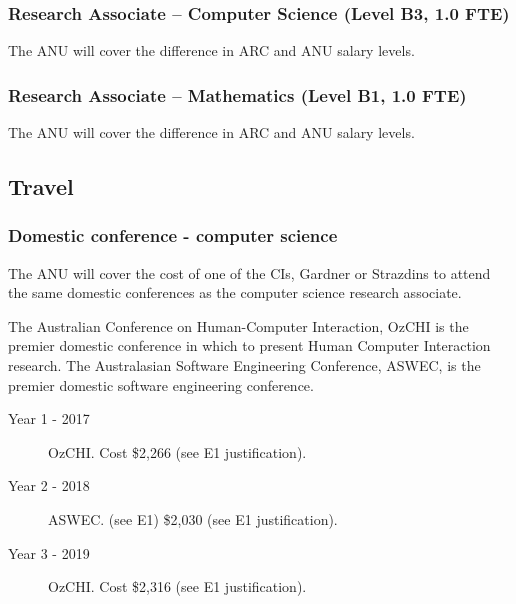 \documentclass[a4paper,fontsize=12pt]{scrartcl}
\begin{document}
\subsubsection*{Research Associate – Computer Science (Level B3, 1.0 FTE)}

The ANU will cover the difference in ARC and ANU salary levels.


\subsubsection*{Research Associate – Mathematics (Level B1, 1.0 FTE)}

The ANU will cover the difference in ARC and ANU salary levels.





\subsection*{Travel}

\subsubsection*{Domestic conference - computer science}

The ANU will cover the cost of one of the CIs, Gardner or Strazdins to attend the  same domestic conferences as the computer science research associate. 

The Australian Conference on Human-Computer Interaction, OzCHI is the premier domestic conference in which to present Human Computer Interaction research. 
The Australasian Software Engineering Conference, ASWEC, is the premier domestic software engineering conference.

\begin{description}
\item[Year 1 - 2017] OzCHI. Cost \$2,266  (see E1 justification).

\item[Year 2 - 2018] ASWEC. (see E1) \$2,030  (see E1 justification).

\item[Year 3 -  2019] OzCHI.  Cost \$2,316 (see E1 justification).

\end{description}
\end{document}
